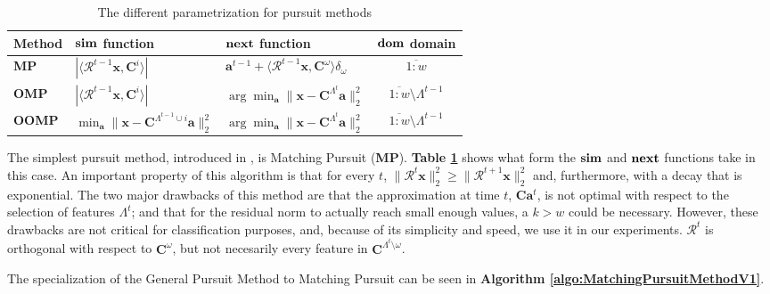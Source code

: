 \documentclass[12pt,a4paper,oneside,english]{UPBThesis}
\newcommand{\hcrange}[2]{\overline{{#1}\colon\!\!{#2}}}
\begin{document}
\renewcommand{\arraystretch}{1.5}
\begin{table}
  \caption{The different parametrization for pursuit methods}
  \label{table:PursuitParametrization}
  \begin{tabularx}{\textwidth}{|l|>{\centering}X|>{\centering}X|c|}
       \hline
        Method & $\text{\textbf{sim}}$ function & $\text{\textbf{next}}$ function & $\text{\textbf{dom}}$ domain\\ \hline \hline
        \textbf{MP} & $\left| \langle \mathcal{R}^{t-1}\textbf{x} , \textbf{C}^i \rangle \right|$ & $\textbf{a}^{t-1} + \langle \mathcal{R}^{t-1}\textbf{x} , \textbf{C}^\omega \rangle \delta_\omega$ & $\hcrange{1}{w}$ \\  \hline
        \textbf{OMP} & $\left| \langle \mathcal{R}^{t-1}\textbf{x} , \textbf{C}^i \rangle \right|$ & $\arg\min_{\textbf{a}} {\| \textbf{x} - \textbf{C}^{\Lambda^t}\textbf{a} \|_2^2}$ & $\hcrange{1}{w} \setminus \Lambda^{t-1}$ \\ \hline
        \textbf{OOMP} & $\min_{\textbf{a}} {\| \textbf{x} - \textbf{C}^{\Lambda^{t-1} \cup i}\textbf{a} \|_2^2}$ & $\arg\min_{\textbf{a}} {\| \textbf{x} - \textbf{C}^{\Lambda^t}\textbf{a} \|_2^2}$ & $\hcrange{1}{w} \setminus \Lambda^{t-1}$ \\
       \hline
    \end{tabularx}
\end{table}
\renewcommand{\arraystretch}{1.0}

The simplest pursuit method, introduced in \cite{matchingpursuit1}, is Matching Pursuit (\textbf{MP}). \textbf{Table \ref{table:PursuitParametrization}} shows what form the $\text{\textbf{sim}}$ and $\text{\textbf{next}}$ functions take in this case. An important property of this algorithm is that for every $t$, $\|\mathcal{R}^t\textbf{x}\|_2^2 \geq \|\mathcal{R}^{t+1}\textbf{x}\|_2^2$ and, furthermore, with a decay that is exponential. The two major drawbacks of this method are that the approximation at time $t$, $\textbf{C}\textbf{a}^t$, is not optimal with respect to the selection of features $\Lambda^t$; and that for the residual norm to actually reach small enough values, a $k > w$ could be necessary. However, these drawbacks are not critical for classification purposes, and, because of its simplicity and speed, we use it in our experiments. $\mathcal{R}^t$ is orthogonal with respect to $\textbf{C}^\omega$, but not necesarily every feature in $\textbf{C}^{\Lambda^t \setminus \omega}$.

The specialization of the General Pursuit Method to Matching Pursuit can be seen in \textbf{Algorithm \ref{algo:MatchingPursuitMethodV1}}.
\end{document}
